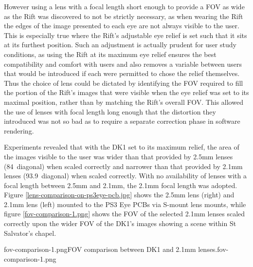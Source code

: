 However using a lens with a focal length short enough to provide a FOV as wide as the Rift was discovered to not be strictly necessary, as when wearing the Rift the edges of the image presented to each eye are not always visible to the user. This is especially true where the Rift's adjustable eye relief is set such that it sits at its furthest position. Such an adjustment is actually prudent for user study conditions, as using the Rift at its maximum eye relief ensures the best compatibility and comfort with users and also removes a variable between users that would be introduced if each were permitted to chose the relief themselves. Thus the choice of lens could be dictated by identifying the FOV required to fill the portion of the Rift's images that were visible when the eye relief was set to its maximal position, rather than by matching the Rift's overall FOV. This allowed the use of lenses with focal length long enough that the distortion they introduced was not so bad as to require a separate correction phase in software rendering.

Experiments revealed that with the DK1 set to its maximum relief, the area of the images visible to the user was wider than that provided by 2.5mm lenses (84\textdegree\ diagonal) when scaled correctly and narrower than that provided by 2.1mm lenses (93.9\textdegree\ diagonal) when scaled correctly. With no availability of lenses with a focal length between 2.5mm and 2.1mm, the 2.1mm focal length was adopted. Figure \ref{lens-comparison-on-ps3eye-pcb.jpg} shows the 2.5mm lens (right) and 2.1mm lens (left) mounted to the PS3 Eye PCBs via S-mount lens mounts, while figure \ref{fov-comparison-1.png} shows the FOV of the selected 2.1mm lenses scaled correctly upon the wider FOV of the DK1's images showing a scene within St Salvator's chapel.

       {fov-comparison-1.png}{FOV comparison between DK1 and 2.1mm lenses.}{fov-comparison-1.png}


